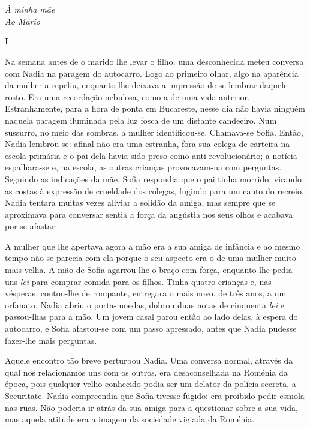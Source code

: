 \chapter*{}
\thispagestyle{empty}

\begin{flushright}
\vfill
\emph{À minha mãe\\Ao Mário}
\end{flushright}

\pagebreak
\thispagestyle{empty}
\movetooddpage

\pagebreak
\vspace*{1.8cm}
\noindent{}\textbf{I}

\bigskip

Na semana antes de o marido lhe levar o filho, uma desconhecida meteu
conversa com Nadia na paragem do autocarro. Logo ao primeiro olhar, algo
na aparência da mulher a repeliu, enquanto lhe deixava a impressão de se
lembrar daquele rosto. Era uma recordação nebulosa, como a de uma vida
anterior. Estranhamente, para a hora de ponta em Bucareste, nesse dia
não havia ninguém naquela paragem iluminada pela luz fosca de um
distante candeeiro. Num sussurro, no meio das sombras, a mulher
identificou-se. Chamava-se Sofia. Então, Nadia lembrou-se: afinal não era uma estranha, fora sua colega de carteira na
escola primária e o pai dela havia sido preso como anti-revolucionário;
a notícia espalhara-se e, na escola, as outras crianças provocavam-na
com perguntas. Seguindo as indicações da mãe, Sofia respondia que o pai
tinha morrido, virando as costas à expressão de crueldade dos colegas,
fugindo para um canto do recreio. Nadia tentara muitas vezes aliviar a
solidão da amiga, mas sempre que se aproximava para conversar sentia a
força da angústia nos seus olhos e acabava por se afastar.

A mulher que lhe apertava agora a mão era a sua amiga de infância e ao
mesmo tempo não se parecia com ela porque o seu aspecto era o de uma
mulher muito mais velha. A mão de Sofia agarrou-lhe o braço com força,
enquanto lhe pedia uns \emph{lei} para comprar comida para os filhos.
Tinha quatro crianças e, nas vésperas, contou-lhe de rompante, entregara
o mais novo, de três anos, a um orfanato. Nadia abriu o porta-moedas,
dobrou duas notas de cinquenta \emph{lei} e passou-lhas para a mão. Um
jovem casal parou então ao lado delas, à espera do autocarro, e Sofia
afastou-se com um passo apressado, antes que Nadia pudesse fazer-lhe
mais perguntas.

Aquele encontro tão breve perturbou Nadia. Uma conversa normal,
através da qual nos relacionamos uns com os outros, era desaconselhada
na Roménia da época, pois qualquer velho conhecido podia ser um delator
da polícia secreta, a Securitate. Nadia compreendia que Sofia tivesse
fugido: era proibido pedir esmola nas ruas. Não poderia ir atrás da sua
amiga para a questionar sobre a sua vida, mas aquela atitude era a
imagem da sociedade vigiada da Roménia.

